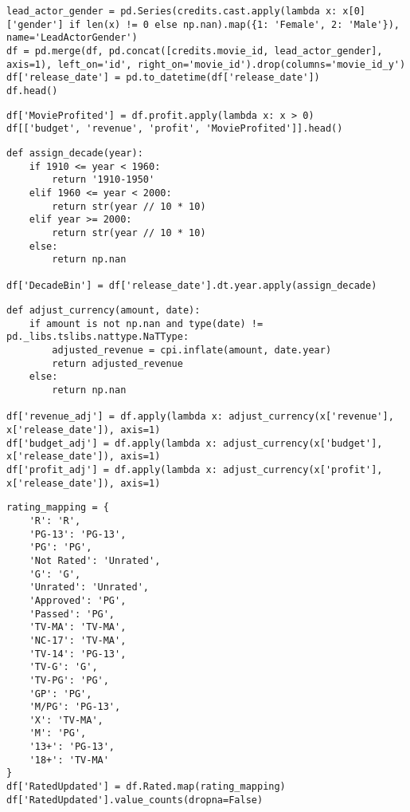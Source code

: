 \begin{lstlisting}
lead_actor_gender = pd.Series(credits.cast.apply(lambda x: x[0]['gender'] if len(x) != 0 else np.nan).map({1: 'Female', 2: 'Male'}), name='LeadActorGender')
df = pd.merge(df, pd.concat([credits.movie_id, lead_actor_gender], axis=1), left_on='id', right_on='movie_id').drop(columns='movie_id_y')
df['release_date'] = pd.to_datetime(df['release_date'])
df.head()
\end{lstlisting}

\begin{lstlisting}
df['MovieProfited'] = df.profit.apply(lambda x: x > 0)
df[['budget', 'revenue', 'profit', 'MovieProfited']].head()
\end{lstlisting}

\begin{lstlisting}
def assign_decade(year):
    if 1910 <= year < 1960:
        return '1910-1950'
    elif 1960 <= year < 2000:
        return str(year // 10 * 10)
    elif year >= 2000:  
        return str(year // 10 * 10)
    else:
        return np.nan

df['DecadeBin'] = df['release_date'].dt.year.apply(assign_decade)
\end{lstlisting}

\begin{lstlisting}
def adjust_currency(amount, date):
    if amount is not np.nan and type(date) != pd._libs.tslibs.nattype.NaTType:
        adjusted_revenue = cpi.inflate(amount, date.year)
        return adjusted_revenue
    else:
        return np.nan

df['revenue_adj'] = df.apply(lambda x: adjust_currency(x['revenue'], x['release_date']), axis=1)
df['budget_adj'] = df.apply(lambda x: adjust_currency(x['budget'], x['release_date']), axis=1)
df['profit_adj'] = df.apply(lambda x: adjust_currency(x['profit'], x['release_date']), axis=1)
\end{lstlisting}

\begin{lstlisting}
rating_mapping = {
    'R': 'R',
    'PG-13': 'PG-13',
    'PG': 'PG',
    'Not Rated': 'Unrated',
    'G': 'G',  
    'Unrated': 'Unrated',  
    'Approved': 'PG',
    'Passed': 'PG',
    'TV-MA': 'TV-MA',
    'NC-17': 'TV-MA',
    'TV-14': 'PG-13',
    'TV-G': 'G',
    'TV-PG': 'PG',
    'GP': 'PG',
    'M/PG': 'PG-13',
    'X': 'TV-MA',
    'M': 'PG',
    '13+': 'PG-13',
    '18+': 'TV-MA'
}
df['RatedUpdated'] = df.Rated.map(rating_mapping)
df['RatedUpdated'].value_counts(dropna=False)
\end{lstlisting}

